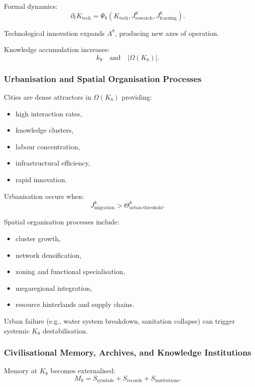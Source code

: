 Formal dynamics:
\[
\partial_t K_{\text{tech}}
= \Psi_8(K_{\text{tech}}, J^8_{\text{research}}, J^8_{\text{learning}}).
\]

Technological innovation expands $A^8$, producing new axes of operation.

Knowledge accumulation increases:
\[
k_8 \quad\text{and}\quad |\Omega(K_8)|.
\]

\subsubsection{Urbanisation and Spatial Organisation Processes}

Cities are dense attractors in $\Omega(K_8)$ providing:
\begin{itemize}
    \item high interaction rates,
    \item knowledge clusters,
    \item labour concentration,
    \item infrastructural efficiency,
    \item rapid innovation.
\end{itemize}

Urbanisation occurs when:
\[
J^8_{\text{migration}} > \Theta^8_{\text{urban-threshold}}.
\]

Spatial organisation processes include:
\begin{itemize}
    \item cluster growth,
    \item network densification,
    \item zoning and functional specialisation,
    \item megaregional integration,
    \item resource hinterlands and supply chains.
\end{itemize}

Urban failure (e.g., water system breakdown, sanitation collapse) can 
trigger systemic $K_8$ destabilisation.

\subsubsection{Civilisational Memory, Archives, and Knowledge Institutions}

Memory at $K_8$ becomes externalised:
\[
M_8 = S_{\text{symbols}} + S_{\text{records}} + S_{\text{institutions}}.
\]

